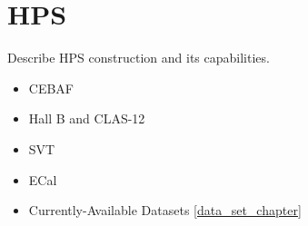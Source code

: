 \chapter{HPS}
\label{chapter:experiment}

Describe HPS construction and its capabilities.
\begin{itemize}
    \item CEBAF \cite{cebaf-2013,cebaf-12GeV-2012,cebaf-opportunities-2012}
    \item Hall B and CLAS-12 \cite{mrsolt-thesis-2020}
    \item SVT
    \item ECal
    \item Currently-Available Datasets \cref{data_set_chapter}
\end{itemize}